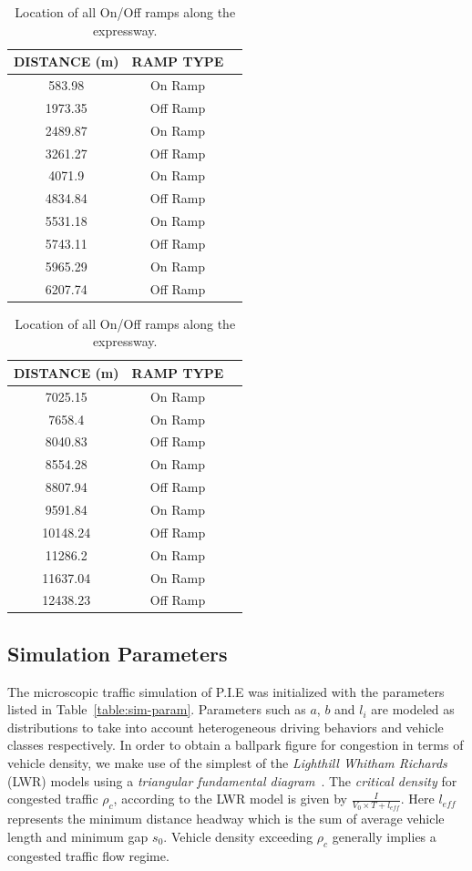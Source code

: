 \documentclass[procedia]{easychair}
\begin{document}
\begin{table}[!ht]
 \centering
\begin{tabular}[b]{ccc}\hline
      {\bf DISTANCE} (m) & {\bf RAMP TYPE} \\ \hline
     583.98 & On Ramp \\ 
     1973.35 & Off Ramp \\ 
     2489.87 & On Ramp \\ 
     3261.27 & Off Ramp \\ 
     4071.9 & On Ramp \\ 
     4834.84 & Off Ramp \\ 
     5531.18 & On Ramp \\ 
     5743.11 & Off Ramp \\ 
     5965.29 & On Ramp \\ 
     6207.74 & Off Ramp \\ \hline
     \end{tabular}
     \quad
     \begin{tabular}[b]{ccc}\hline
       {\bf DISTANCE} (m) & {\bf RAMP TYPE} \\ \hline
     7025.15 & On Ramp \\ 
     7658.4 & On Ramp \\ 
     8040.83 & Off Ramp \\ 
     8554.28 & On Ramp \\ 
     8807.94 & Off Ramp\\ 
     9591.84 & On Ramp \\ 
     10148.24 & Off Ramp \\ 
     11286.2 & On Ramp \\ 
     11637.04 & On Ramp \\ 
     12438.23 & Off Ramp \\  \hline
    \end{tabular}
      \caption{Location of all On/Off ramps along the expressway.}
      \label{table:on-off-ramp}
\end{table}


 

\subsection{Simulation Parameters}
\label{sec:simparam}

The microscopic traffic simulation of P.I.E  was initialized with the parameters listed in Table~\ref{table:sim-param}. Parameters such as $a$, $b$ and $l_{i}$ are modeled as distributions to take into account heterogeneous driving behaviors and vehicle classes respectively. In order to obtain a ballpark figure for congestion in terms of vehicle density, we make use of the simplest of the {\it Lighthill Whitham Richards} (LWR) models using a {\it triangular fundamental diagram}~\cite{Traffic_Flow_Treiber}. The {\it critical density} for congested traffic $\rho_{c}$, according to the LWR model is given by $\frac{I}{V_0\times T+l_{eff}}$. Here $l_{eff}$ represents the minimum distance headway which is the sum of average vehicle length and minimum gap $s_{0}$. Vehicle density exceeding $\rho_{c}$ generally implies a congested traffic flow regime. 
\end{document}
